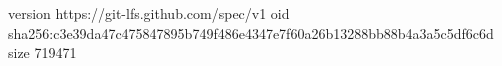 version https://git-lfs.github.com/spec/v1
oid sha256:c3e39da47c475847895b749f486e4347e7f60a26b13288bb88b4a3a5c5df6c6d
size 719471
